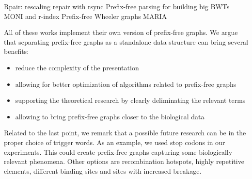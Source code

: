 Rpair: rescaling repair with rsync \cite{2019gagie}
Prefix-free parsing for building big BWTs \cite{2019boucher}
MONI and r-index \cite{rossi2022moni,gagie2020fully}
Prefix-free Wheeler graphs \cite{2022pfwg}
MARIA \cite{2022maria}

All of these works implement their own version of prefix-free graphs.
We argue that separating prefix-free graphs as a standalone data structure can
bring several benefits:

\begin{itemize}
    \item reduce the complexity of the presentation
    \item allowing for better optimization of algorithms related to prefix-free graphs
    \item supporting the theoretical research by clearly deliminating the relevant terms
    \item allowing to bring prefix-free graphs closer to the biological data
\end{itemize}

Related to the last point, we remark that a possible future research can be in
the proper choice of trigger words.
As an example, we used stop codons in our experiments.
This could create prefix-free graphs capturing some biologically relevant phenomena.
Other options are recombination hotspots, highly repetitive elements, different
binding sites and sites with increased breakage.


